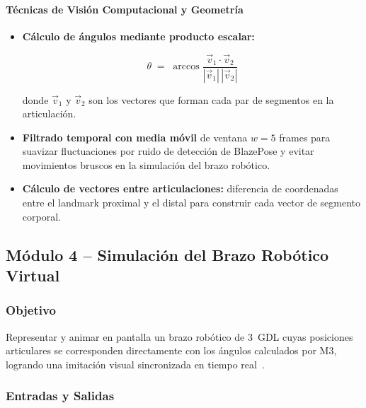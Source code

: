 \paragraph{Técnicas de Visión Computacional y Geometría}
\begin{itemize}[leftmargin=1.5em]
  \item \textbf{Cálculo de ángulos mediante producto escalar:}
        \cite{GonzalezWoods2018}
 
        \begin{equation}
            \theta \;=\; \arccos{ \frac{\vec{v}_1 \cdot \vec{v}_2}{|\vec{v}_1|\,|\vec{v}_2|} }
            \label{eq:angulo}
        \end{equation}

        donde $\vec{v}_1$ y $\vec{v}_2$ son los vectores que forman
        cada par de segmentos en la articulación.

  \item \textbf{Filtrado temporal con media móvil} de ventana $w = 5$
        frames para suavizar fluctuaciones por ruido de detección de
        BlazePose y evitar movimientos bruscos en la simulación del
        brazo robótico.
  \item \textbf{Cálculo de vectores entre articulaciones:} diferencia
        de coordenadas entre el landmark proximal y el distal para
        construir cada vector de segmento corporal.
\end{itemize}
 

\subsection{Módulo 4 -- Simulación del Brazo Robótico Virtual}

\subsubsection*{Objetivo}
Representar y animar en pantalla un brazo robótico de 3~GDL cuyas
posiciones articulares se corresponden directamente con los ángulos
calculados por M3, logrando una imitación visual sincronizada en
tiempo real~\cite{Altayeb2023}.

\subsubsection*{Entradas y Salidas}

